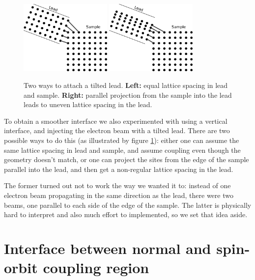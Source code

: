 \begin{figure}
    \begin{center}
        \includegraphics[width=0.4\textwidth]{lead-tilted-1.pdf}
        \hspace{0.1\textwidth}
        \includegraphics[width=0.4\textwidth]{lead-tilted-2.pdf}
    \end{center}
    \caption{Two ways to attach a tilted lead. \textbf{Left:} equal lattice
        spacing in lead and sample. \textbf{Right:} parallel projection from
        the sample into the lead leads to uneven lattice spacing in the lead.}
    \label{fig:tilted-leads}
\end{figure}

To obtain a smoother interface we also experimented with using a vertical
interface, and
injecting the electron beam with a tilted lead. There are two possible
ways to do this (as illustrated by figure \ref{fig:tilted-leads}):
either one can assume the same lattice spacing in lead and sample, and assume
coupling even though the geometry doesn't match, or one can project the sites
from the edge of the sample parallel into the lead, and then get a non-regular
lattice spacing in the lead.

The former turned out not to work the way we wanted it to: instead of one
electron beam propagating in the same direction as the lead, there were two
beams, one parallel to each side of the edge of the sample. The latter is
physically hard to interpret and also much effort to implemented, so we set
that idea aside.

\section{Interface between normal and spin-orbit coupling region}

